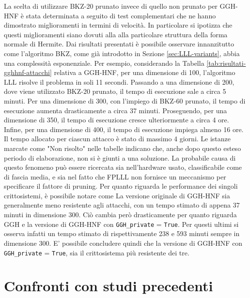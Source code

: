 La scelta di utilizzare BKZ-20 prunato invece di quello non prunato per GGH-HNF è stata 
determinata a seguito di test complementari che ne hanno dimostrato miglioramenti in 
termini di velocità. In particolare si ipotizza che questi miglioramenti siano dovuti
alla alla particolare struttura della forma normale di Hermite.
Dai risultati presentati è possibile osservare innanzitutto come l'algoritmo BKZ,
come già introdotto in Sezione \ref{sec:LLL-variants}, abbia una complessità esponenziale.
Per esempio, considerando la Tabella \ref{tab:risultati-gghhnf-attacchi} relativa a GGH-HNF, 
per una dimensione di 100, l'algoritmo 
LLL risolve il problema in 
soli 11 secondi. Passando a una dimensione di 200, dove viene utilizzato 
BKZ-20 prunato, il tempo di esecuzione sale a circa 5 minuti. Per una dimensione di 300, 
con l'impiego di BKZ-60 prunato, il tempo di esecuzione aumenta drasticamente a circa 37 minuti. 
Proseguendo, per una dimensione di 350, il tempo di esecuzione cresce ulteriormente a circa 
4 ore. Infine, per una dimensione di 400, il tempo di esecuzione impiega almeno 16 ore.
Il tempo allocato per ciascun attacco è stato di massimo 4 giorni.
Le istanze marcate come "Non risolto" nelle tabelle 
indicano che, anche dopo questo esteso periodo di elaborazione, non si è giunti a una soluzione. 
La probabile causa di questo fenomeno può essere ricercata sia nell'hardware usato, classificabile
come di fascia media, e sia nel fatto che FPLLL non fornisce un meccanismo per specificare 
il fattore di pruning.
Per quanto riguarda le performance dei singoli crittosistemi, è possibile notare come La
versione originale di GGH-HNF sia generalmente meno resistente agli attacchi, con un tempo stimato di 
appena 37 minuti in dimensione 300. Ciò cambia però drasticamente per quanto riguarda
GGH e la versione di GGH-HNF con \texttt{GGH\_private} = \texttt{True}. Per questi ultimi
si osserva infatti un tempo stimato di rispettivamente 238 e 593 minuti sempre in dimensione
300. E' possibile concludere quindi che la versione di GGH-HNF con 
\texttt{GGH\_private} = \texttt{True}, sia il crittosistema più resistente dei tre. 

\section{Confronti con studi precedenti}

